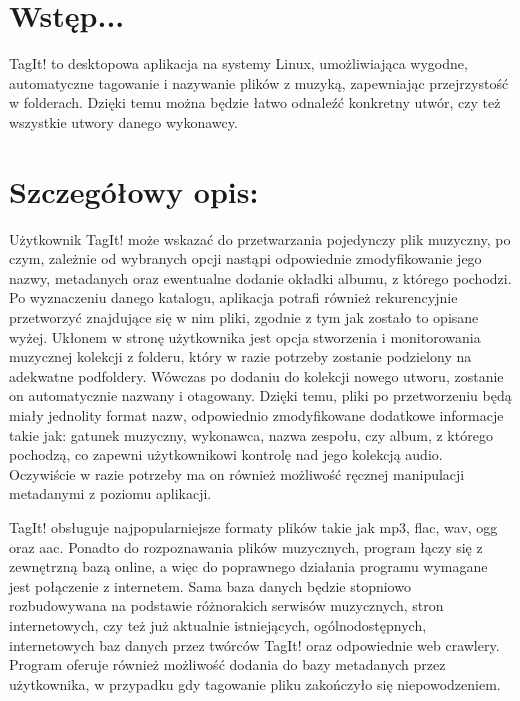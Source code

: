\hypertarget{index_intro_sec}{}\section{Wstęp...}\label{index_intro_sec}
Tag\-It! to desktopowa aplikacja na systemy Linux, umożliwiająca wygodne, automatyczne tagowanie i nazywanie plików z muzyką, zapewniając przejrzystość w folderach. Dzięki temu można będzie łatwo odnaleźć konkretny utwór, czy też wszystkie utwory danego wykonawcy.\hypertarget{index_install_sec}{}\section{Szczegółowy opis\-:}\label{index_install_sec}
Użytkownik Tag\-It! może wskazać do przetwarzania pojedynczy plik muzyczny, po czym, zależnie od wybranych opcji nastąpi odpowiednie zmodyfikowanie jego nazwy, metadanych oraz ewentualne dodanie okładki albumu, z którego pochodzi. Po wyznaczeniu danego katalogu, aplikacja potrafi również rekurencyjnie przetworzyć znajdujące się w nim pliki, zgodnie z tym jak zostało to opisane wyżej. Ukłonem w stronę użytkownika jest opcja stworzenia i monitorowania muzycznej kolekcji z folderu, który w razie potrzeby zostanie podzielony na adekwatne podfoldery. Wówczas po dodaniu do kolekcji nowego utworu, zostanie on automatycznie nazwany i otagowany. Dzięki temu, pliki po przetworzeniu będą miały jednolity format nazw, odpowiednio zmodyfikowane dodatkowe informacje takie jak\-: gatunek muzyczny, wykonawca, nazwa zespołu, czy album, z którego pochodzą, co zapewni użytkownikowi kontrolę nad jego kolekcją audio. Oczywiście w razie potrzeby ma on również możliwość ręcznej manipulacji metadanymi z poziomu aplikacji.

Tag\-It! obsługuje najpopularniejsze formaty plików takie jak mp3, flac, wav, ogg oraz aac. Ponadto do rozpoznawania plików muzycznych, program łączy się z zewnętrzną bazą online, a więc do poprawnego działania programu wymagane jest połączenie z internetem. Sama baza danych będzie stopniowo rozbudowywana na podstawie różnorakich serwisów muzycznych, stron internetowych, czy też już aktualnie istniejących, ogólnodostępnych, internetowych baz danych przez twórców Tag\-It! oraz odpowiednie web crawlery. Program oferuje również możliwość dodania do bazy metadanych przez użytkownika, w przypadku gdy tagowanie pliku zakończyło się niepowodzeniem. 